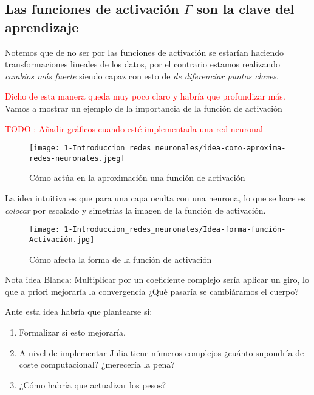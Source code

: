 \subsection*{Las funciones de activación $\Gamma$ son la clave del aprendizaje}  

Notemos que de no ser por las funciones de activación se estarían haciendo transformaciones lineales de los datos, por el contrario estamos realizando \textit{cambios más fuerte} siendo capaz con esto de \textit{de diferenciar puntos claves}.

\textcolor{red}{Dicho de esta manera queda muy poco claro y habría que profundizar más.}
Vamos a mostrar un ejemplo de la importancia de la función de activación 

\textcolor{red}{TODO : Añadir gráficos cuando esté implementada una red neuronal}


\begin{figure}[h!]
    \texttt{[image: 1-Introduccion\_redes\_neuronales/idea-como-aproxima-redes-neuronales.jpeg]}
    \caption{Cómo actúa en la aproximación una función de activación}
    \label{img:idea-como-aproxima-redes-neuronales}
   \end{figure}

La idea intuitiva es que para una capa oculta con una neurona, 
lo que se hace es \textit{colocar} por escalado y simetrías la imagen de la función de activación. 

\begin{figure}[h!]
    \texttt{[image: 1-Introduccion\_redes\_neuronales/Idea-forma-función-Activación.jpg]}
    \caption{Cómo afecta la forma de la función de activación}
    \label{img:como afecta la forma de la función de aproximación}
   \end{figure}

\iconoAclaraciones \textcolor{dark_green}{ Nota idea Blanca: Multiplicar por un coeficiente complejo sería aplicar un giro,
 lo que a priori mejoraría la convergencia
 ¿Qué pasaría se cambiáramos el cuerpo?}

Ante esta idea habría que plantearse si: 

\begin{enumerate}
    \item Formalizar si esto mejoraría.
    \item A nivel de implementar Julia tiene números complejos ¿cuánto supondría de coste computacional? ¿merecería la pena?
    \item ¿Cómo habría que actualizar los pesos?
\end{enumerate}

